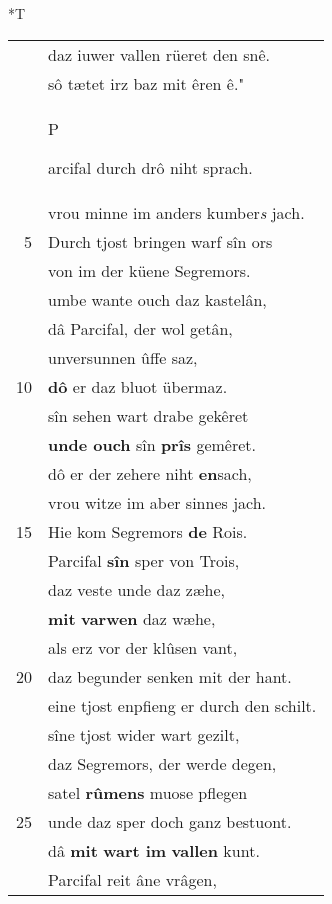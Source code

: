 \documentclass[8pt,a4paper,notitlepage]{article}
\begin{document}
\begin{table}[ht]
\begin{minipage}[t]{0.5\linewidth}
\end{minipage}
\hspace{0.5cm}
\begin{minipage}[t]{0.5\linewidth}
\small
\begin{center}*T
\end{center}
\begin{tabular}{rl}
 & daz iuwer vallen rüeret den snê.\\ 
 & sô tætet irz baz mit êren ê."\\ 
 & \begin{large}P\end{large}arcifal durch drô niht sprach.\\ 
 & vrou minne im anders kumber\textit{s} jach.\\ 
5 & Durch tjost bringen warf sîn ors\\ 
 & von im der küene Segremors.\\ 
 & umbe wante ouch daz kastelân,\\ 
 & dâ Parcifal, der wol getân,\\ 
 & unversunnen ûffe saz,\\ 
10 & \textbf{dô} er daz bluot übermaz.\\ 
 & sîn sehen wart drabe gekêret\\ 
 & \textbf{unde ouch} sîn \textbf{prîs} gemêret.\\ 
 & dô er der zehere niht \textbf{en}sach,\\ 
 & vrou witze im aber sinnes jach.\\ 
15 & Hie kom Segremors \textbf{de} Rois.\\ 
 & Parcifal \textbf{sîn} sper von Trois,\\ 
 & daz veste unde daz zæhe,\\ 
 & \textbf{mit} \textbf{varwen} daz wæhe,\\ 
 & als erz vor der klûsen vant,\\ 
20 & daz begunder senken mit der hant.\\ 
 & eine tjost enpfieng er durch den schilt.\\ 
 & sîne tjost wider wart gezilt,\\ 
 & daz Segremors, der werde degen,\\ 
 & satel \textbf{rûmens} muose pflegen\\ 
25 & unde daz sper doch ganz bestuont.\\ 
 & dâ \textbf{mit} \textbf{wart im} \textbf{vallen} kunt.\\ 
 & Parcifal reit âne vrâgen,\\ 

\end{tabular}
\end{minipage}
\end{table}
\end{document}
